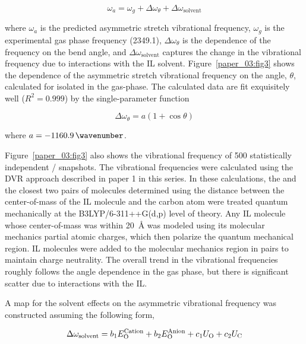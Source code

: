 \documentclass[]{article}
\begin{document}
\begin{equation}
  \label{paper_03:eq:1}
  \omega_{a} = \omega_{g} + \Delta\omega_{\theta} + \Delta\omega_{\text{solvent}}
\end{equation}

where \(\omega_{a}\) is the predicted  asymmetric stretch vibrational frequency, \(\omega_{g}\) is the experimental gas phase frequency (\SI{2349.1}{\wavenumber}), \(\Delta\omega_{\theta}\) is the dependence of the frequency on the  bend angle, and \(\Delta\omega_{\text{solvent}}\) captures the change in the vibrational frequency due to interactions with the IL solvent. Figure~\ref{paper_03:fig3} shows the dependence of the  asymmetric stretch vibrational frequency on the  angle, \(\theta\), calculated for  isolated in the gas-phase. The calculated data are fit exquisitely well (\(R^{2} = 0.999\)) by the single-parameter function

\begin{equation}
  \label{paper_03:eq:2}
  \Delta\omega_{\theta} = a(1 + \cos{\theta})
\end{equation}

where \(a = \SI{-1160.9}{\wavenumber}\).

Figure~\ref{paper_03:fig3} also shows the vibrational frequency of \num{500} statistically independent /\ce{[C4C1im][PF6]} snapshots. The vibrational frequencies were calculated using the DVR approach described in paper 1 in this series. In these calculations, the  and the closest two pairs of \ce{[C4C1im][PF6]} molecules \textemdash{} determined using the distance between the center-of-mass of the IL molecule and the  carbon atom \textemdash{} were treated quantum mechanically at the B3LYP/6-311++G(d,p) level of theory. Any IL molecule whose center-of-mass was within \SI{20}{\angstrom} was modeled using its molecular mechanics partial atomic charges, which then polarize the quantum mechanical region. IL molecules were added to the molecular mechanics region in pairs to maintain charge neutrality. The overall trend in the vibrational frequencies roughly follows the angle dependence in the gas phase, but there is significant scatter due to interactions with the IL.

A map for the solvent effects on the asymmetric  vibrational frequency was constructed assuming the following form,

\begin{equation}
  \label{paper_03:eq:3}
  \Delta\omega_{\text{solvent}} = b_{1}E_{\ce{O}}^{\text{Cation}} + b_{2}E_{\ce{O}}^{\text{Anion}} + c_{1}U_{\ce{O}} + c_{2}U_{\ce{C}}
\end{equation}
\end{document}
